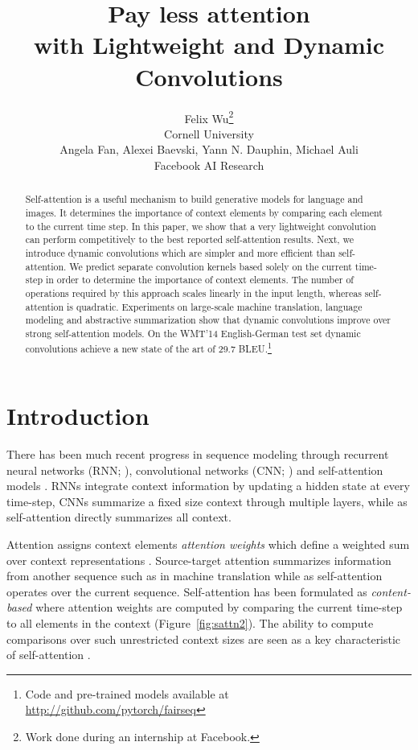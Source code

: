\documentclass{article} \usepackage{iclr2019_conference,times}
\title{Pay less attention\\ with Lightweight and Dynamic Convolutions}
\author{Felix Wu\thanks{Work done during an internship at Facebook.} \\
Cornell University\\
\And
Angela Fan, Alexei Baevski, Yann N. Dauphin, Michael Auli \\
Facebook AI Research \\
}
\begin{document}
\maketitle

\begin{abstract}
Self-attention is a useful mechanism to build generative models for language and images. 
It determines the importance of context elements by comparing each element to the current time step.
In this paper, we show that a very lightweight convolution can perform competitively to the best reported self-attention results.
Next, we introduce dynamic convolutions which are simpler and more efficient than self-attention.
We predict separate convolution kernels based solely on the current time-step in order to determine the importance of context elements. 
The number of operations required by this approach scales linearly in the input length, whereas self-attention is quadratic.
Experiments on large-scale machine translation, language modeling and abstractive summarization show that dynamic convolutions improve over strong self-attention models. 
On the WMT'14 English-German test set dynamic convolutions achieve a new state of the art of 29.7 BLEU.\footnote{Code and pre-trained models available at \url{http://github.com/pytorch/fairseq}} 
\end{abstract}



\section{Introduction}
There has been much recent progress in sequence modeling through recurrent neural networks (RNN; \citealt{sutskever2014sequence,bahdanau2015neural,wu2016google}), convolutional networks (CNN; \citealt{kalchbrenner2016nmt,gehring2016convolutional,gehring2017convs2s,kaiser2017depthwise}) and self-attention models \citep{paulus17intra,vaswani2017transformer}. 
RNNs integrate context information by updating a hidden state at every time-step, CNNs summarize a fixed size context through multiple layers, while as self-attention directly summarizes all context.

Attention assigns context elements \emph{attention weights} which define a weighted sum over context representations \citep{bahdanau2015neural,sukhbaatar2015memnet,chorowski2015asr,luong2015effective}.
Source-target attention summarizes information from another sequence such as in machine translation while as self-attention operates over the current sequence.
Self-attention has been formulated as \emph{content-based} where attention weights are computed by comparing the current time-step to all elements in the context (Figure~\ref{fig:sattn2}). 
The ability to compute comparisons over such unrestricted context sizes are seen as a key characteristic of self-attention \citep{vaswani2017transformer}.
\end{document}
